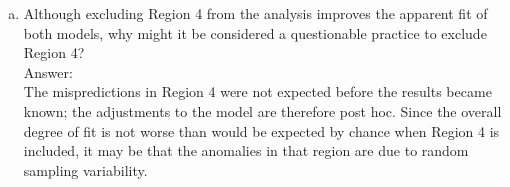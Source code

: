 \documentclass[11pt,notitlepage]{article}\usepackage[]{graphicx}\usepackage[]{color}
\makeatletter
\newenvironment{kframe}{%
 \def\at@end@of@kframe{}%
 \ifinner\ifhmode%
  \def\at@end@of@kframe{\end{minipage}}%
  \begin{minipage}{\columnwidth}%
 \fi\fi%
 \def\FrameCommand##1{\hskip\@totalleftmargin \hskip-\fboxsep
 \colorbox{shadecolor}{##1}\hskip-\fboxsep
     \hskip-\linewidth \hskip-\@totalleftmargin \hskip\columnwidth}%
 \MakeFramed {\advance\hsize-\width
   \@totalleftmargin\z@ \linewidth\hsize
   \@setminipage}}%
 {\par\unskip\endMakeFramed%
 \at@end@of@kframe}
\newenvironment{knitrout}{}{} %
\makeatother
\begin{document}
\begin{enumerate}[a)]
\begin{knitrout}
\begin{kframe}
    \begin{Verbatim}[commandchars=\\\{\}]
{\color{incolor}In [{\color{incolor}8}]:} \PY{k}{scalar} pvalue\PYZus{}1=chiprob(\PY{l+m}{9}, model\PYZus{}1\PYZus{}chi\PYZus{}sq)
        \PY{k}{disp} \PY{n+nFormat}{\PYZpc{}8.5f} model\PYZus{}1\PYZus{}chi\PYZus{}sq
        \PY{k}{disp} \PY{n+nFormat}{\PYZpc{}8.6f} pvalue\PYZus{}1
\end{Verbatim}

    \begin{Verbatim}[commandchars=\\\{\}]

 7.32282

0.603548

    \end{Verbatim}

    \begin{Verbatim}[commandchars=\\\{\}]
{\color{incolor}In [{\color{incolor}9}]:} \PY{k}{qui}\PY{k}{ tabstat} chi\PYZus{}square\PYZus{}2, statistics(sum)\PY{k}{ save}
        \PY{k}{scalar}  model\PYZus{}2\PYZus{}chi\PYZus{}sq=\PY{n+nf}{el}(\PY{n+nf}{r}(StatTotal),\PY{l+m}{1},\PY{l+m}{1})
        \PY{k}{scalar} pvalue\PYZus{}2=chiprob(\PY{l+m}{13}, model\PYZus{}2\PYZus{}chi\PYZus{}sq)
        \PY{k}{disp} \PY{n+nFormat}{\PYZpc{}8.5f} model\PYZus{}2\PYZus{}chi\PYZus{}sq
        \PY{k}{disp} \PY{n+nFormat}{\PYZpc{}8.6f} pvalue\PYZus{}2
\end{Verbatim}

    \begin{Verbatim}[commandchars=\\\{\}]

 7.68664

0.863399

    \end{Verbatim}

\end{kframe}
\end{knitrout}

\item Although excluding Region 4 from the analysis improves the apparent fit of both models, why might it be considered a questionable practice to exclude Region 4?\\
Answer:\\
The mispredictions in Region 4 were not expected before the results became known; the adjustments to the model are therefore post hoc. Since the overall degree of fit is not worse than would be expected by chance when Region 4 is included, it may be that the anomalies in that region are due to random sampling variability.
\end{enumerate}
\end{document}
